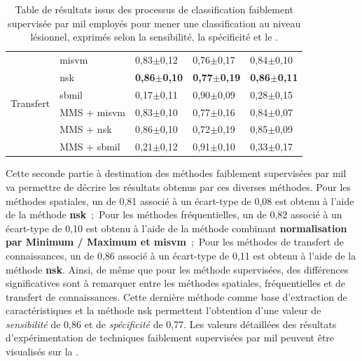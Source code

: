 \begin{table}[H]
\begin{tabular}{cllll}
        \multirow{6}{*}{Transfert}   & \gls{misvm}          & 0,83$\pm$0,12             & 0,76$\pm$0,17             & 0,84$\pm$0,10             \\
                                     & \gls{nsk}            & \textbf{0,86$\pm$0,10}    & \textbf{0,77$\pm$0,19}    & \textbf{0,86$\pm$0,11}    \\
                                     & \gls{sbmil}          & 0,17$\pm$0,11             & 0,90$\pm$0,09             & 0,28$\pm$0,15             \\
                                     & MMS + \gls{misvm}    & 0,83$\pm$0,10             & 0,77$\pm$0,16             & 0,84$\pm$0,07             \\
                                     & MMS + \gls{nsk}      & 0,86$\pm$0,10             & 0,72$\pm$0,19             & 0,85$\pm$0,09             \\
                                     & MMS + \gls{sbmil}    & 0,21$\pm$0,12             & 0,91$\pm$0,10             & 0,33$\pm$0,17             \\ \bottomrule
    \end{tabular}
    \caption{Table de résultats issus des processus de classification faiblement supervisée par \gls{mil} employés pour mener une classification au niveau lésionnel, exprimés selon la sensibilité, la spécificité et le \fscore{}.}
    \label{tab:results_lesion_classification_weakly_patient}
\end{table}
\clearpage

Cette seconde partie à destination des méthodes faiblement supervisées par \gls{mil} va permettre de décrire les résultats obtenus par ces diverses méthodes. Pour les méthodes spatiales, un \fscore{} de 0,81 associé à un écart-type de 0,08 est obtenu à l'aide de la méthode \textbf{\gls{nsk}}~;~Pour les méthodes fréquentielles, un \fscore{} de 0,82 associé à un écart-type de 0,10 est obtenu à l'aide de la méthode combinant \textbf{normalisation par Minimum / Maximum et \gls{misvm}}~;~Pour les méthodes de transfert de connaissances, un \fscore{} de 0,86 associé à un écart-type de 0,11 est obtenu à l'aide de la méthode \textbf{\gls{nsk}}. Ainsi, de même que pour les méthode supervisées, des différences significatives sont à remarquer entre les méthodes spatiales, fréquentielles et de transfert de connaissances. Cette dernière méthode comme base d'extraction de caractéristiques et la méthode \gls{nsk} permettent l'obtention d'une valeur de \textit{sensibilité} de 0,86 et de \textit{spécificité} de 0,77. Les valeurs détaillées des résultats d'expérimentation de techniques faiblement supervisées par \gls{mil} peuvent être visualisés sur la .\par


